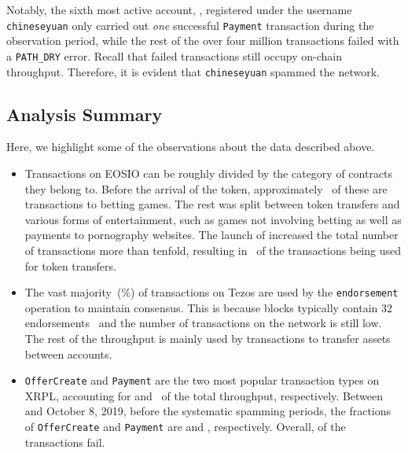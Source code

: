 Notably, the sixth most active account, , registered under the username \texttt{chineseyuan} only carried out \textit{one} successful \texttt{Payment} transaction during the observation period, while the rest of the over four million transactions failed with a \texttt{PATH\_DRY} error. Recall that failed transactions still occupy on-chain throughput. Therefore, it is evident that \texttt{chineseyuan} spammed the network.



\subsection{Analysis Summary}
Here, we highlight some of the observations about the data described above. 
\begin{itemize}\itemsep=0pt
    \item Transactions on EOSIO can be roughly divided by the category of contracts they belong to. 
    Before the arrival of the  token, approximately~ of these are transactions to betting games. The rest was split between token transfers and various forms of entertainment, such as games not involving betting as well as payments to pornography websites. The launch of  increased the total number of transactions more than tenfold, resulting in~ of the transactions being used for token transfers.
    
    \item The vast majority~(\%) of transactions on Tezos are used by the \texttt{endorsement} operation to maintain consensus. This is because blocks typically contain 32 endorsements~\cite{Tezos2018} and the number of transactions on the network is still low. The rest of the throughput is mainly used by transactions to transfer assets between accounts.
    
    \item \texttt{OfferCreate} and \texttt{Payment} are the two most popular transaction types on XRPL, accounting for  and~ of the total throughput, respectively. Between \startdate and October 8, 2019, before the systematic spamming periods, the fractions of \texttt{OfferCreate} and \texttt{Payment} are  and , respectively. Overall,  of the transactions fail.
\end{itemize}

